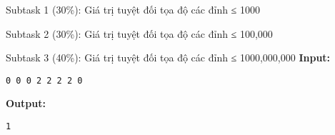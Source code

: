 Subtask 1 (30\%): Giá trị tuyệt đối tọa độ các đỉnh ≤ 1000  

   Subtask 2 (30\%): Giá trị tuyệt đối tọa độ các đỉnh ≤ 100,000  

   Subtask 3 (40\%): Giá trị tuyệt đối tọa độ các đỉnh ≤ 1000,000,000
\textbf{    Input:   }
\begin{verbatim}
0 0 0 2 2 2 2 0
\end{verbatim}

\textbf{    Output:   }
\begin{verbatim}
1\end{verbatim}